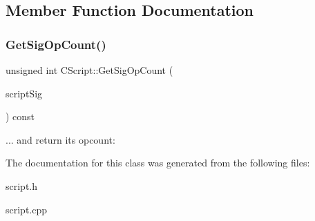 \subsection{Member Function Documentation}
\mbox{\label{class_c_script_ab2fc38465955bb6688d204036633ee85}} 
\subsubsection{\texorpdfstring{GetSigOpCount()}{GetSigOpCount()}}
{\footnotesize\ttfamily unsigned int C\+Script\+::\+Get\+Sig\+Op\+Count (\begin{DoxyParamCaption}\item[{const \mbox{\hyperlink{class_c_script}{C\+Script}} \&}]{script\+Sig }\end{DoxyParamCaption}) const}

... and return its opcount\+: 

The documentation for this class was generated from the following files\+:\begin{DoxyCompactItemize}
\item 
script.\+h\item 
script.\+cpp\end{DoxyCompactItemize}
